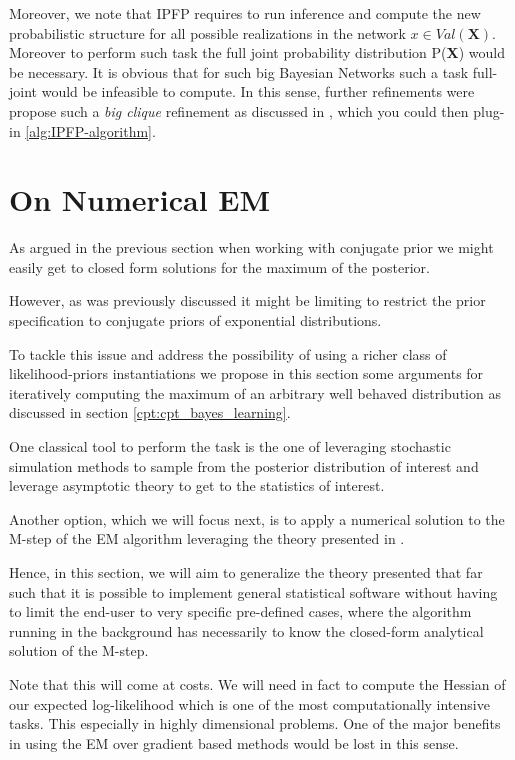 \documentclass[11pt]{article}
\begin{document}
\begin{article}
Moreover, we note that IPFP requires to run inference and compute
the new probabilistic structure for all possible realizations in
the network \(x \in Val(\textbf{X})\). Moreover to perform such task
the full joint probability distribution P(\textbf{X}) would be
necessary. It is obvious that for such big Bayesian Networks such a
task full-joint would be infeasible to compute. In this sense,
further refinements were propose such a \emph{big clique} refinement as 
discussed in \cite{PENG_2010}, which you could then plug-in
\ref{alg:IPFP-algorithm}.


\section{On Numerical EM}
\label{sec:orgd55fa3c}

As argued in the previous section when working with conjugate prior
we might easily get to closed form solutions for the maximum of the
posterior.

However, as was previously discussed it might be limiting to
restrict the prior specification to conjugate priors of exponential
distributions.

To tackle this issue and address the possibility of using a richer
class of likelihood-priors instantiations we propose in this
section some arguments for iteratively computing the maximum of an
arbitrary well behaved distribution as discussed in section
\ref{cpt:cpt_bayes_learning}.

One classical tool to perform the task is the one of leveraging
stochastic simulation methods to sample from the posterior
distribution of interest and leverage asymptotic theory to get to
the statistics of interest.

Another option, which we will focus next, is to apply a numerical
solution to the M-step of the EM algorithm leveraging the theory
presented in \cite{ruud1989comparison}.

Hence, in this section, we will aim to generalize the theory
presented that far such that it is possible to implement general
statistical software without having to limit the end-user to very
specific pre-defined cases, where the algorithm running in the
background has necessarily to know the closed-form analytical
solution of the M-step.

Note that this will come at costs. We will need in fact to compute
the Hessian of our expected log-likelihood which is one of the most
computationally intensive tasks. This especially in highly
dimensional problems. One of the major benefits in using the EM over
gradient based methods would be lost in this sense.


\end{article}
\end{document}
